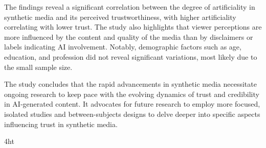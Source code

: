 \documentclass[
  a4paper,  %
  twoside,  %
  bibliography=totoc,
  headsepline,
  cleardoublepage=empty,
  parskip=half,
  draft=false
]{scrbook}
\begin{document}
The findings reveal a significant correlation between the degree of artificiality in synthetic media and its perceived trustworthiness, with higher artificiality correlating with lower trust. The study also highlights that viewer perceptions are more influenced by the content and quality of the media than by disclaimers or labels indicating AI involvement. Notably, demographic factors such as age, education, and profession did not reveal significant variations, most likely due to the small sample size.

The study concludes that the rapid advancements in synthetic media necessitate ongoing research to keep pace with the evolving dynamics of trust and credibility in AI-generated content. It advocates for future research to employ more focused, isolated studies and between-subjects designs to delve deeper into specific aspects influencing trust in synthetic media.


\cleardoublepage



\iftex4ht
\else
\fi

%
%

%
%
%
\tableofcontents


\listoffigures
\listoftables


\let\iflistings\iffalse
\iflistings
  \ifdeutsch
  \else
  \fi
\fi

\let\ifalgorithms\iffalse
\ifalgorithms
  \ifdeutsch
  \else
  \fi
\fi
\end{document}
